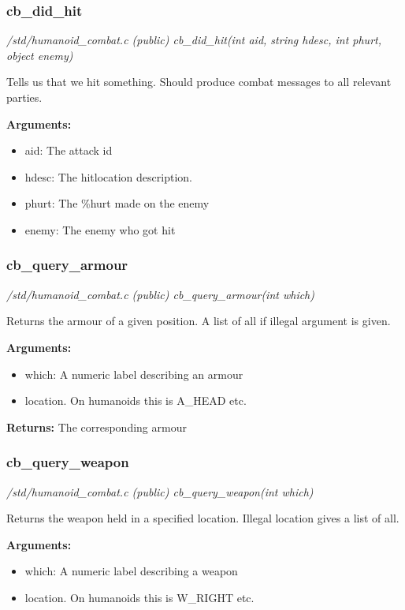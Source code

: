 \subsubsection{cb\_did\_hit}

{\em /std/humanoid\_combat.c (public) cb\_did\_hit(int aid, string hdesc, int phurt, object enemy)}

Tells us that we hit something. Should produce combat
messages to all relevant parties. 

{\bf Arguments:}
\begin{itemize}
\item      aid:   The attack id
\item hdesc: The hitlocation description.
\item phurt: The \%hurt made on the enemy
\item enemy: The enemy who got hit
\end{itemize}


\subsubsection{cb\_query\_armour}

{\em /std/humanoid\_combat.c (public) cb\_query\_armour(int which)}

Returns the armour of a given position.
A list of all if illegal argument is given.

{\bf Arguments:}
\begin{itemize}
\item     which: A numeric label describing an armour
\item location. On humanoids this is A\_HEAD etc.
\end{itemize}

{\bf Returns:}        The corresponding armour


\subsubsection{cb\_query\_weapon}

{\em /std/humanoid\_combat.c (public) cb\_query\_weapon(int which)}

Returns the weapon held in a specified location.
Illegal location gives a list of all.

{\bf Arguments:}
\begin{itemize}
\item     which: A numeric label describing a weapon
\item location. On humanoids this is W\_RIGHT etc.
\end{itemize}


